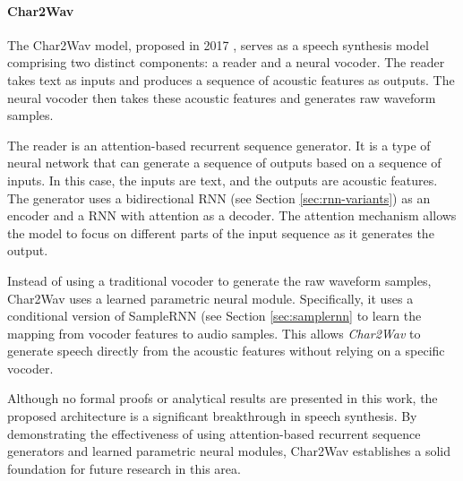\paragraph{Char2Wav}

The Char2Wav model, proposed in 2017 \cite{rao_grapheme--phoneme_2015}, serves as a speech synthesis model comprising two distinct components: a reader and a neural vocoder. The reader takes text as inputs and produces a sequence of acoustic features as outputs. The neural vocoder then takes these acoustic features and generates raw waveform samples.

The reader is an attention-based recurrent sequence generator. It is a type of neural network that can generate a sequence of outputs based on a sequence of inputs. In this case, the inputs are text, and the outputs are acoustic features. The generator uses a bidirectional \ac{RNN} (see Section \ref{sec:rnn-variants}) as an encoder and a \ac{RNN} with attention as a decoder. The attention mechanism allows the model to focus on different parts of the input sequence as it generates the output.

Instead of using a traditional vocoder to generate the raw waveform samples, Char2Wav uses a learned parametric neural module. Specifically, it uses a conditional version of SampleRNN (see Section \ref{sec:samplernn} to learn the mapping from vocoder features to audio samples. This allows \textit{Char2Wav} to generate speech directly from the acoustic features without relying on a specific vocoder.

Although no formal proofs or analytical results are presented in this work, the proposed architecture is a significant breakthrough in speech synthesis. By demonstrating the effectiveness of using attention-based recurrent sequence generators and learned parametric neural modules, Char2Wav establishes a solid foundation for future research in this area.